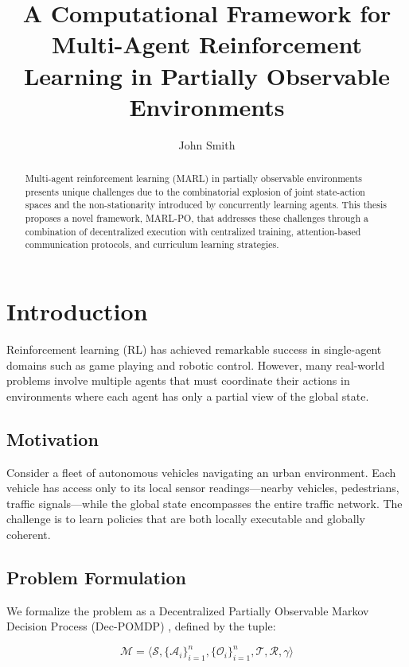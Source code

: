 \documentclass[12pt,a4paper]{report}
\title{A Computational Framework for Multi-Agent Reinforcement Learning
       in Partially Observable Environments}
\author{John Smith}
\date{}
\begin{document}
\maketitle

\begin{abstract}
Multi-agent reinforcement learning (MARL) in partially observable environments presents unique
challenges due to the combinatorial explosion of joint state-action spaces and the non-stationarity
introduced by concurrently learning agents. This thesis proposes a novel framework, MARL-PO,
that addresses these challenges through a combination of decentralized execution with centralized
training, attention-based communication protocols, and curriculum learning strategies.
\end{abstract}

\tableofcontents

\chapter{Introduction}
\label{ch:intro}

Reinforcement learning (RL) has achieved remarkable success in single-agent domains such as game
playing and robotic control. However, many real-world problems involve multiple agents that must
coordinate their actions in environments where each agent has only a partial view of the global state.

\section{Motivation}
Consider a fleet of autonomous vehicles navigating an urban environment. Each vehicle has access
only to its local sensor readings---nearby vehicles, pedestrians, traffic signals---while the global
state encompasses the entire traffic network. The challenge is to learn policies that are both
locally executable and globally coherent.

\section{Problem Formulation}
We formalize the problem as a Decentralized Partially Observable Markov Decision Process (Dec-POMDP)
\cite{oliehoek2016concise}, defined by the tuple:

\begin{equation}
\mathcal{M} = \langle \mathcal{S}, \{\mathcal{A}_i\}_{i=1}^n, \{\mathcal{O}_i\}_{i=1}^n,
    \mathcal{T}, \mathcal{R}, \gamma \rangle
\label{eq:dec_pomdp}
\end{equation}
\end{document}
